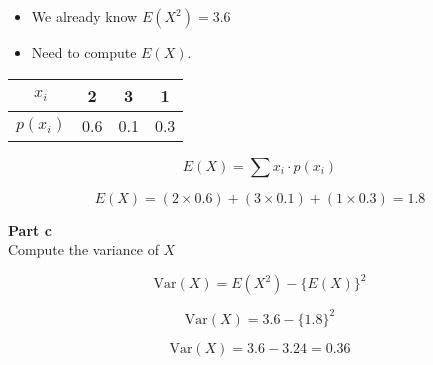 \documentclass[a4paper,12pt]{article}
\begin{document}
\begin{itemize}
\item We already know $E(X^2) =3.6$
\item Need to compute $E(X)$.
\end{itemize}




\begin{center}
\begin{tabular}{|c|c|c|c|}
\hline
$x_i$ & 2 & 3 & 1 \\ \hline 
$p(x_i)$ & 0.6 &  0.1 & 0.3 \\ \hline
\end{tabular}
\end{center}

\[ E(X) =  \sum  x_i \cdot p(x_i)   \]










\[E(X) = (2\times 0.6) + (3 \times 0.1) + (1 \times 0.3) = 1.8 \]








\noindent \textbf{Part c}\\
Compute the variance of $X$

\[ \mbox{Var}(X) = E(X^2) - \{E(X)\}^2 \]

\[ \mbox{Var}(X) = 3.6 - \{1.8\}^2 \]


\[ \mbox{Var}(X) = 3.6 - 3.24  = \boldsymbol{0.36} \]


\end{document}
